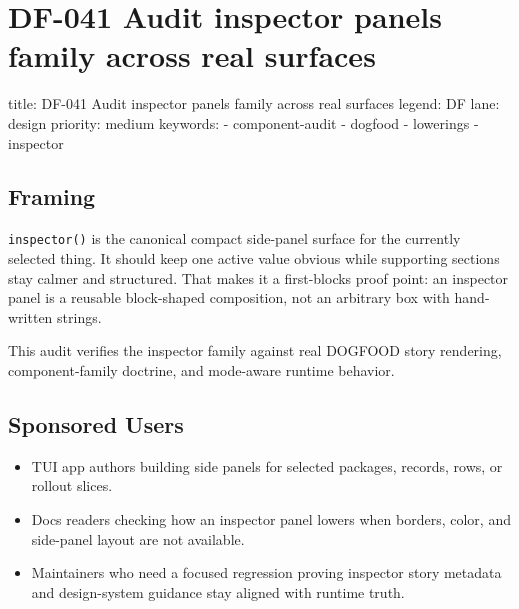 \chapter{DF-041 Audit inspector panels family across real surfaces}\label{record-095}

\smallskip

\begin{RecordMeta}
title: DF-041 Audit inspector panels family across real surfaces
legend: DF
lane: design
priority: medium
keywords:
  - component-audit
  - dogfood
  - lowerings
  - inspector

\end{RecordMeta}

\section{Framing}\label{record-095-framing}

\texttt{i\allowbreak{}n\allowbreak{}s\allowbreak{}p\allowbreak{}e\allowbreak{}c\allowbreak{}t\allowbreak{}o\allowbreak{}r\allowbreak{}(\allowbreak{})} is the canonical compact side-panel surface for the currently selected thing. It should keep one active value obvious while supporting sections stay calmer and structured. That makes it a first-blocks proof point: an inspector panel is a reusable block-shaped composition, not an arbitrary box with hand-written strings.

This audit verifies the inspector family against real DOGFOOD story rendering, component-family doctrine, and mode-aware runtime behavior.

\section{Sponsored Users}\label{record-095-sponsored-users}

\begin{itemize}
\tightlist
\item
  TUI app authors building side panels for selected packages, records, rows, or rollout slices.
\item
  Docs readers checking how an inspector panel lowers when borders, color, and side-panel layout are not available.
\item
  Maintainers who need a focused regression proving inspector story metadata and design-system guidance stay aligned with runtime truth.
\end{itemize}

